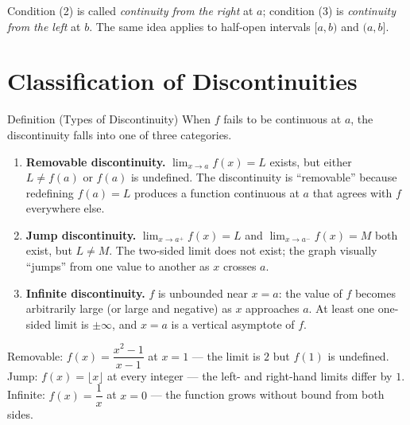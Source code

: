\begin{remark*}
Condition (2) is called \emph{continuity from the right} at $a$;
condition (3) is \emph{continuity from the left} at $b$.
The same idea applies to half-open intervals $[a, b)$ and $(a, b]$.
\end{remark*}

\section*{Classification of Discontinuities}

\begin{propositionbox}{Definition (Types of Discontinuity)}
When $f$ fails to be continuous at $a$, the discontinuity falls into
one of three categories.
\begin{enumerate}
  \item \textbf{Removable discontinuity.}
        $\lim_{x \to a} f(x) = L$ exists, but either $L \neq f(a)$
        or $f(a)$ is undefined.
        The discontinuity is ``removable'' because redefining
        $f(a) = L$ produces a function continuous at $a$ that agrees
        with $f$ everywhere else.

  \item \textbf{Jump discontinuity.}
        $\lim_{x \to a^+} f(x) = L$ and $\lim_{x \to a^-} f(x) = M$
        both exist, but $L \neq M$.
        The two-sided limit does not exist; the graph visually
        ``jumps'' from one value to another as $x$ crosses $a$.

  \item \textbf{Infinite discontinuity.}
        $f$ is unbounded near $x = a$: the value of $f$ becomes
        arbitrarily large (or large and negative) as $x$ approaches
        $a$.
        At least one one-sided limit is $\pm\infty$, and $x = a$
        is a vertical asymptote of $f$.
\end{enumerate}
\end{propositionbox}

\begin{remark*}
Removable: $f(x) = \dfrac{x^2 - 1}{x - 1}$ at $x = 1$ --- the
limit is $2$ but $f(1)$ is undefined.
Jump: $f(x) = \lfloor x \rfloor$ at every integer --- the left- and
right-hand limits differ by $1$.
Infinite: $f(x) = \dfrac{1}{x}$ at $x = 0$ --- the function grows
without bound from both sides.
\end{remark*}

